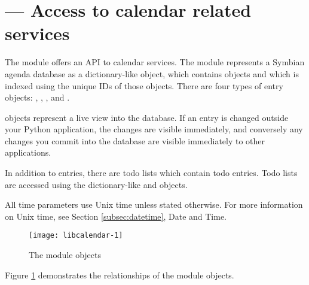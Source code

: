 %
%
%

\section{ ---
  Access to calendar related services}
\label{sec:calendar}


The  module offers an API to calendar services. The 
 module represents a Symbian agenda database as a 
dictionary-like  object, which contains 
objects and which is indexed using the unique IDs of those objects. There 
are four types of entry objects: , 
, , and . 

 objects represent a live view into the database. If an 
entry is changed outside your Python application, the changes are visible 
immediately, and conversely any changes you commit into the database are 
visible immediately to other applications. 

In addition to entries, there are todo lists which contain todo entries. 
Todo lists are accessed using the dictionary-like  and 
 objects.

All time parameters use Unix time unless stated otherwise. For more 
information on Unix time, see Section \ref{subsec:datetime}, 
Date and Time.

\begin{figure}
\centering
\texttt{[image: libcalendar-1]}
\caption{The  module objects}
\label{libcalendar-1}
\end{figure}

Figure \ref{libcalendar-1} demonstrates the relationships of the 
 module objects. 

